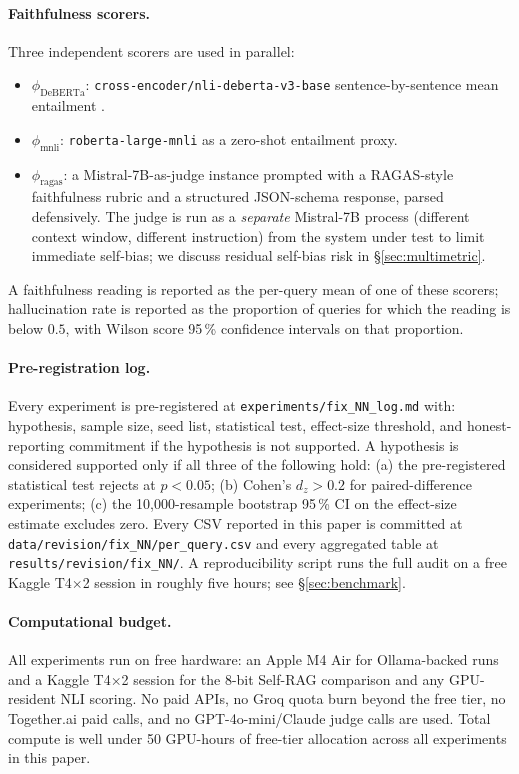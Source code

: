 \paragraph{Faithfulness scorers.}
Three independent scorers are used in parallel:
\begin{itemize}
\itemsep -2pt
\item \(\phi_{\mathrm{DeBERTa}}\):
\texttt{cross-encoder/nli-deberta-v3-base} sentence-by-sentence
mean entailment \citep{he2021debertav3}.
\item \(\phi_{\mathrm{mnli}}\): \texttt{roberta-large-mnli} as a
zero-shot entailment proxy.
\item \(\phi_{\mathrm{ragas}}\): a Mistral-7B-as-judge instance
prompted with a RAGAS-style \citep{shahul2024ragas} faithfulness
rubric and a structured JSON-schema response, parsed defensively.
The judge is run as a \emph{separate} Mistral-7B process (different
context window, different instruction) from the system under test
to limit immediate self-bias; we discuss residual self-bias risk
in \S\ref{sec:multimetric}.
\end{itemize}
A faithfulness reading is reported as the per-query mean of one of
these scorers; hallucination rate is reported as the proportion of
queries for which the reading is below $0.5$, with Wilson score
95\,\% confidence intervals on that proportion.

\paragraph{Pre-registration log.}
Every experiment is pre-registered at
\texttt{experiments/fix\_NN\_log.md} with: hypothesis, sample size,
seed list, statistical test, effect-size threshold, and
honest-reporting commitment if the hypothesis is not supported. A
hypothesis is considered supported only if all three of the
following hold: (a) the pre-registered statistical test rejects at
$p<0.05$; (b) Cohen's $d_z>0.2$ for paired-difference experiments;
(c) the 10{,}000-resample bootstrap 95\,\% CI on the effect-size
estimate excludes zero. Every CSV reported in this paper is
committed at \texttt{data/revision/fix\_NN/per\_query.csv} and
every aggregated table at
\texttt{results/revision/fix\_NN/}. A reproducibility script
runs the full audit on a free Kaggle T4\(\times\)2 session in roughly
five hours; see \S\ref{sec:benchmark}.

\paragraph{Computational budget.}
All experiments run on free hardware: an Apple M4 Air for
Ollama-backed runs and a Kaggle T4\(\times\)2 session for the
8-bit Self-RAG comparison and any GPU-resident NLI scoring.
No paid APIs, no Groq quota burn beyond the free tier, no
Together.ai paid calls, and no GPT-4o-mini/Claude judge calls
are used. Total compute is well under 50 GPU-hours of free-tier
allocation across all experiments in this paper.

